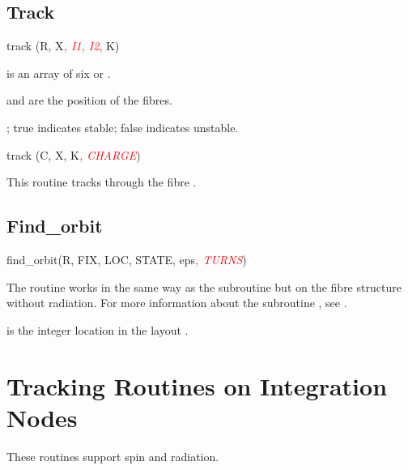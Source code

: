 \subsection{Track}

%
\begin{ptccode}
track (R, X\textit{\textcolor{red}{, I1, I2}}, K)
\end{ptccode}

 is an array of six  or .

 and  are the position of the fibres.


; true indicates stable; false indicates unstable.

\begin{ptccode}
track (C, X, K\textit{\textcolor{red}{, CHARGE}})
\end{ptccode}

This routine tracks through the fibre .


\subsection{Find_orbit}

%
\begin{ptccode}
find_orbit(R, FIX, LOC, STATE, eps\textit{\textcolor{red}{, TURNS}})
\end{ptccode}

The  routine works in the same way as the
subroutine  but on the fibre structure
without radiation. For more information about the subroutine
, see .

 is the integer location in the layout .


\section{Tracking Routines on Integration Nodes}

%
These routines support spin and radiation.


